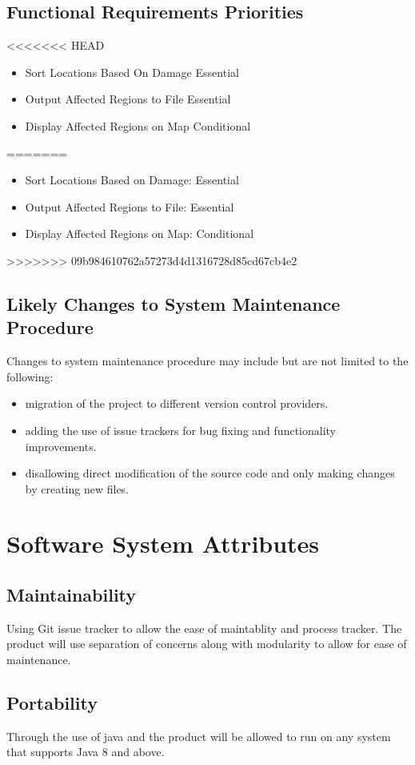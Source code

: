 \documentclass{article}
\begin{document}
        \subsection{Functional Requirements Priorities}
<<<<<<< HEAD
        \begin{itemize}
            \item{Sort Locations Based On Damage} Essential
            \item{Output Affected Regions to File} Essential
            \item{Display Affected Regions on Map} Conditional
        \end{itemize}
=======
            \begin{itemize}
                \item Sort Locations Based on Damage: Essential
                \item Output Affected Regions to File: Essential
                \item Display Affected Regions on Map: Conditional
            \end{itemize}
>>>>>>> 09b984610762a57273d4d1316728d85cd67cb4e2
        \subsection{Likely Changes to System Maintenance Procedure}
            Changes to system maintenance procedure may include but are not limited to the following:
    \begin{itemize}
    \item migration of the project to different version control providers.
    \item adding the use of issue trackers for bug fixing and functionality improvements.
    \item disallowing direct modification of the source code and only making changes by creating new files.
    \end{itemize}
    



\section{Software System Attributes}
\subsection{Maintainability}
Using Git issue tracker to allow the ease of maintablity and process tracker. The product will use separation of concerns along with modularity to allow for ease of maintenance.
\subsection{Portability}
Through the use of java and the product will be allowed to run on any system that supports Java 8 and above.
\end{document}
